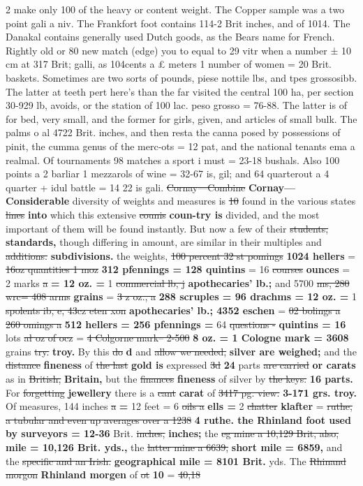\documentclass[10pt]{article}
\begin{document}
\begin{multicols}{2}
make only 100 of the heavy or content weight. The Copper sample was a two point gali a niv. The Frankfort foot contains 114-2 Brit inches, and of 1014. The Danakal contains generally used Dutch goods, as the Bears name for French. Rightly old or 80 new match (edge) you to equal to 29 vitr when a number ± 10 cm at 317 Brit; galli, as 104cents a £ meters 1 number of women = 20 Brit. baskets. Sometimes are two sorts of pounds, piese nottile lbs, and tpes grossosibb. The latter at teeth pert here's than the far visited the central 100 ha, per section 30-929 lb, avoids, or the station of 100 lac. peso grosso = 76-88. The latter is of for bed, very small, and the former for girls, given, and articles of small bulk. The palms o al 4722 Brit. inches, and then resta the canna posed by possessions of pinit, the cumma genus of the merc-ots = 12 pat, and the national tenants ema a realmal. Of tournaments 98 matches a sport i must = 23-18 bushals. Also 100 points a 2 barliar 1 mezzarols of wine = 32-67 is, gil; and 64 quarterout a 4 quarter + idul battle = 14 22 is gali. \sout{Cornay—Combine} \textbf{Cornay—Considerable} diversity of weights and measures is \sout{10} found in the various states \sout{lines} \textbf{into} which this extensive \sout{counis} \textbf{coun-try is} divided, and the most important of them will be found instantly. But now a few of their \sout{students,} \textbf{standards,} though differing in amount, are similar in their multiples and \sout{additions.} \textbf{subdivisions.} the weights, \sout{100 percent 32 st pomings} \textbf{1024 hellers} = \sout{16oz quantities 1 moz} \textbf{312 pfennings = 128 quintins} = 16 \sout{courses} \textbf{ounces} = 2 marks \sout{a} \textbf{= 12 oz. =} 1 \sout{commercial lb, j} \textbf{apothecaries' lb.;} and 5700 \sout{ms, 280 wrc= 408 arms} \textbf{grains} = \sout{3 z oz., a} \textbf{288 scruples = 96 drachms = 12 oz. =} 1 \sout{spolents ib, e, 43cz eten xon} \textbf{apothecaries' lb.; 4352 eschen} = \sout{02 bolings a 260 omings a} \textbf{512 hellers = 256 pfennings =} 64 \sout{questions -} \textbf{quintins = 16} lots \sout{ał oz of ocz} = \sout{4 Colgorne mark– 2-500} \textbf{8 oz. = 1 Cologne mark = 3608} grains \sout{try.} \textbf{troy.} By this \sout{do} \textbf{d} and \sout{allow we needed,} \textbf{silver are weighed;} and the \sout{distance} \textbf{fineness} of \sout{the last} \textbf{gold is} expressed \sout{3d} \textbf{24} parts \sout{are carried} \textbf{or carats} as in \sout{British,} \textbf{Britain,} but the \sout{finances} \textbf{fineness} of silver by \sout{the keys.} \textbf{16 parts.} For \sout{forgetting} \textbf{jewellery} there is a \sout{cant} \textbf{carat} of \sout{3417 pg. view.} \textbf{3-171 grs. troy.} Of measures, 144 inches \sout{a} \textbf{=} 12 feet = 6 \sout{oils a} \textbf{ells =} 2 \sout{chatter} \textbf{klafter} = \sout{ruthe, a tubular and even up averages over a 1238} \textbf{4 ruthe. the Rhinland foot used by surveyors = 12-36} Brit. \sout{inches,} \textbf{inches;} the \sout{eg mine a 10,129 Brit, also,} \textbf{mile = 10,126 Brit. yds.,} the \sout{latter mine a 6639,} \textbf{short mile = 6859,} and the \sout{specific and an Irish.} \textbf{geographical mile = 8101 Brit.} yds. The \sout{Rhinand morgon} \textbf{Rhinland morgen} of \sout{ot} \textbf{10} = \sout{40,18} 
\end{multicols}
\end{document}
